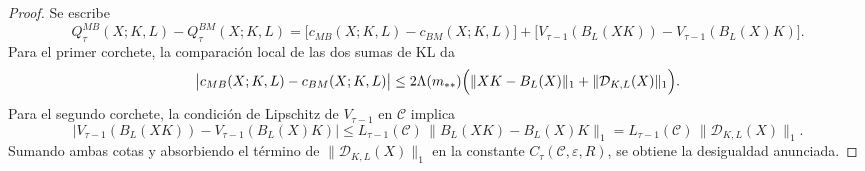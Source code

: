 ﻿\documentclass[12pt]{article}
\begin{document}
\begin{proof}
Se escribe
\[
Q_\tau^{MB}(X;K,L)-Q_\tau^{BM}(X;K,L)
=
\bigl[c_{MB}(X;K,L)-c_{BM}(X;K,L)\bigr]
+
\bigl[V_{\tau-1}(B_L(XK))-V_{\tau-1}(B_L(X)K)\bigr].
\]
Para el primer corchete, la comparación local de las dos sumas de KL da
\[
\bigl|c_{MB}(X;K,L)-c_{BM}(X;K,L)\bigr|
\le
2\Lambda(m_{**})\Bigl(\|XK-B_L(X)\|_1+\|\mathcal D_{K,L}(X)\|_1\Bigr).
\]
Para el segundo corchete, la condición de Lipschitz de \(V_{\tau-1}\) en \(\mathcal C\) implica
\[
\bigl|V_{\tau-1}(B_L(XK))-V_{\tau-1}(B_L(X)K)\bigr|
\le
L_{\tau-1}(\mathcal C)\,\|B_L(XK)-B_L(X)K\|_1
=
L_{\tau-1}(\mathcal C)\,\|\mathcal D_{K,L}(X)\|_1.
\]
Sumando ambas cotas y absorbiendo el término de \(\|\mathcal D_{K,L}(X)\|_1\) en la constante \(C_\tau(\mathcal C,\varepsilon,R)\), se obtiene la desigualdad anunciada.
\end{proof}
\end{document}

